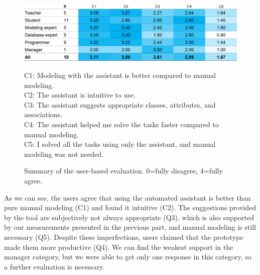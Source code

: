 \begin{figure}[!h]
    \includegraphics[width=1\linewidth]{img/user-based-evaluation.png} \\
    \scriptsize
\raggedright{C1: Modeling with the assistant is better compared to manual modeling. \\
C2: The assistant is intuitive to use.\\
C3: The assistant suggests appropriate classes, attributes, and associations.\\
C4: The assistant helped me solve the tasks faster compared to manual modeling.\\
C5: I solved all the tasks using only the assistant, and manual modeling was not needed.}
    \caption{Summary of the user-based evaluation. 0=fully disagree, 4=fully agree.}
    \label{fig:user-based-evaluation}
\end{figure}

As we can see, the users agree that using the automated assistant is better than pure manual modeling (C1) and found it intuitive (C2).
The suggestions provided by the tool are subjectively not always appropriate (Q3), which is also supported by our measurements presented in the previous part, and manual modeling is still necessary (Q5).
Despite these imperfections, users claimed that the prototype made them more productive (Q4).
We can find the weakest support in the manager category, but we were able to get only one response in this category, so a further evaluation is necessary.